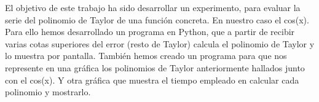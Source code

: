 
El objetivo de este trabajo ha sido desarrollar un experimento, para evaluar la serie del polinomio de Taylor de una funci\'on concreta. En nuestro caso el cos(x). Para ello hemos desarrollado un programa en Python, que a partir de recibir varias cotas superiores del error (resto de Taylor) calcula el polinomio de Taylor y lo muestra por pantalla.
Tambi\'en hemos creado un programa para que nos represente en una gr\'afica los polinomios de Taylor anteriormente hallados junto con el cos(x). Y otra gr\'afica que muestra el tiempo empleado en calcular cada polinomio y mostrarlo.

